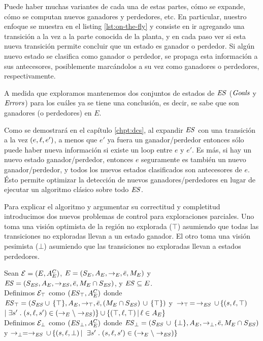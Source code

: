 Puede haber muchas variantes de cada una de estas partes, cómo se expande, cómo se computan nuevos ganadores y perdedores, etc. En particular, nuestro enfoque se muestra en el listing \ref{lst:on-the-fly} y consiste en ir agregando una transición a la vez a la parte conocida de la planta, y en cada paso ver si esta nueva transición permite concluir que un estado es ganador o perdedor. Si algún nuevo estado se clasifica como ganador  o perdedor, se propaga esta información a sus antecesores, posiblemente marcándolos a su vez como ganadores o perdedores, respectivamente.

A medida que exploramos mantenemos dos conjuntos de estados de $\mathit{ES}$ ($\mathit{Goals}$ y $\mathit{Errors}$) para los cuáles ya se tiene una conclusión, es decir, se sabe que son ganadores (o perdedores) en $E$.

Como se demostrará en el capítulo \ref{chpt:dcs}, al expandir $\mathit{ES}$ con una transición a la vez $(e,\ell,e')$, a menos que $e'$ ya fuera un ganador/perdedor entonces sólo puede haber nueva información si existe un loop entre $e$ y $e'$. Es más, si hay un nuevo estado ganador/perdedor, entonces $e$ seguramente es también un nuevo ganador/perdedor, y todos los nuevos estados clasificados son antecesores de $e$. Ésto permite optimizar la detección de nuevos ganadores/perdedores en lugar de ejecutar un algoritmo clásico sobre todo $\mathit{ES}$.




Para explicar el algoritmo y argumentar su correctitud y completitud introducimos dos nuevos problemas de control para exploraciones parciales. Uno toma una visión optimista de la región no explorada ($\top$) asumiendo que todas las transiciones no exploradas llevan a un estado ganador. El otro toma una visión pesimista ($\bot$) asumiendo que las transiciones no exploradas llevan a estados perdedores.

\begin{definition}
	 \label{def:unexploredTo}
	
	Sean $\mathcal{E} = (E, A_E^C)$, $E = (S_E,A_E,\rightarrow_E,\bar{e},M_E)$ y $\mathit{ES} = 
	(S_{\mathit{ES}},A_E, \rightarrow_{\mathit{ES}},\bar{e},M_E \cap S_{\mathit{ES}})$, y $\mathit{ES} 
	\subseteq E$.
	\\
	Definimos $\mathcal{E}_\top$ como $(\mathit{\mathit{ES}_{\top}}, A_E^C)$ donde 
	$\mathit{\mathit{ES}_{\top}} = (S_{\mathit{ES}} \cup \, \{\top\},A_E,\rightarrow_\top, 
	\bar{e}, 
	(M_E \cap S_{\mathit{ES}})\, \cup \, \{\top\})$ y $\, \rightarrow_\top \, = \, \rightarrow_{\mathit{ES}} 
	\, 
	\cup\, \{(s,\ell, \top) 
	\;$ $ | \; \exists s' \;.\; (s, \ell, s') \in (\rightarrow_E \setminus \rightarrow_{\mathit{ES}})\} \cup \{(\top, \ell, \top) \, | \, \ell \in A_E\}$ \\
	Definimos $\mathcal{E}_\bot$ como $(\mathit{\mathit{ES}_{\bot}}, A_E^C)$ donde 
	$\mathit{\mathit{ES}_{\bot}} = (S_{\mathit{ES}} \, \cup \, 
	\{\bot\},A_E,\rightarrow_\bot, 
	\bar{e}, M_E \cap S_{\mathit{ES}})$ y $\rightarrow_\bot = \rightarrow_{\mathit{ES}} \, \cup \, \{(s,\ell, 
	\bot) \, | \, $ $ \exists s' \;.\; (s, \ell, s') \in (\rightarrow_E \setminus \rightarrow_{\mathit{ES}})\}$ 
\end{definition}

